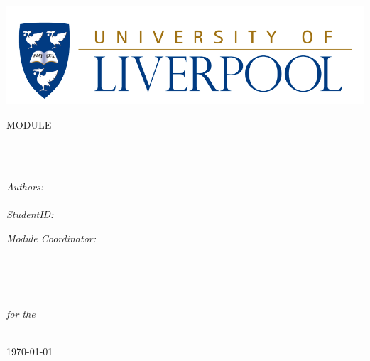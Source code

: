 \documentclass[10pt, english, singlespacing, headsepline]{MastersDoctoralThesis}
\author{Forename \textsc{Surname}} %
\def\Year{\expandafter\YEAR\the\year}
\def\YEAR#1#2#3#4{#1#2#3#4}
\begin{document}
\sloppy
\pagestyle{plain} %


\begin{titlepage}
\begin{center}
\includegraphics[scale=0.3]{uol-logo} %

\vspace*{.06\textheight}
{\scshape\LARGE \univname\par}\vspace{1.5cm} %
\textsc{\Large MODULE - \Year}\\[0.5cm] %

\HRule \\[0.4cm] %
{\huge \bfseries \ttitle\par}\vspace{0.4cm} %
\HRule \\[1.5cm] %

\begin{minipage}[t]{0.4\textwidth}
\begin{flushleft} \large
\emph{Authors:}\\
\authorname\\
\vspace{\baselineskip}
\emph{StudentID:}\\
\addressname
\end{flushleft}
\end{minipage}
\begin{minipage}[t]{0.4\textwidth}
\begin{flushright} \large
\emph{Module Coordinator:} \\
\supname \\
\end{flushright}
\end{minipage}\\[3cm]

\vfill

\degreename\\[0.3cm] %
\textit{for the}\\[0.4cm]
\deptname\\[1cm]

\vfill

{\large \today}\\[4cm] %
\vfill
\end{center}
\end{titlepage}
\end{document}

